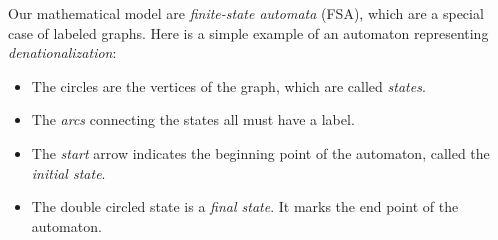 Our mathematical model are \emph{finite-state automata} (FSA), which are a special case of labeled graphs.
Here is a simple example of an automaton representing \emph{denationalization}:
%
\begin{center}
\end{center}
%
\begin{itemize}
    \item The circles are the vertices of the graph, which are called \emph{states}.
    \item The \emph{arcs} connecting the states all must have a label.
    \item The \emph{start} arrow indicates the beginning point of the automaton, called the \emph{initial state}.
    \item The double circled state is a \emph{final state}.
        It marks the end point of the automaton.
\end{itemize}

